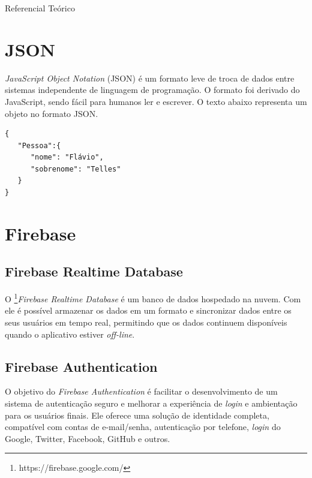 \documentclass[
	12pt,				%
	openany,			%
	twoside,			%
	a4paper,			%
	english,			%
	french,				%
	spanish,			%
	brazil				%
	]{abntex2}
\begin{document}
\begin{chapter}{Referencial Teórico}
\newpage
\section{JSON} \label{JSON}
\textit{JavaScript Object Notation} (JSON) é um formato leve de troca de dados entre sistemas independente de linguagem de programação. O formato foi derivado do JavaScript, sendo fácil para humanos ler e escrever. O texto abaixo representa um objeto no formato JSON.

\begin{lstlisting}
{
   "Pessoa":{
      "nome": "Flávio",
      "sobrenome": "Telles"
   }
}
\end{lstlisting}

\section{Firebase}
\subsection{Firebase Realtime Database} \label{Firebase Realtime Database}
O \footnote{https://firebase.google.com/}{\textit{Firebase Realtime Database}} é um banco de dados hospedado na nuvem. Com ele é possível armazenar os dados em um formato  e sincronizar dados entre os seus usuários em tempo real, permitindo que os dados continuem disponíveis quando o aplicativo estiver \textit{off-line}.

\subsection{Firebase Authentication}
O objetivo do \textit{Firebase Authentication} é facilitar o desenvolvimento de um sistema de autenticação seguro e melhorar a experiência de \textit{login} e ambientação para os usuários finais. Ele oferece uma solução de identidade completa, compatível com contas de e-mail/senha, autenticação por telefone, \textit{login} do Google, Twitter, Facebook, GitHub e outros.
\end{chapter}
\end{document}
